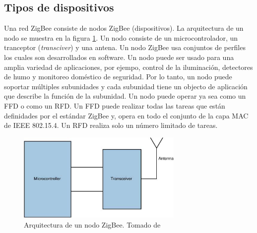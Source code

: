 \documentclass[10pt,journal,compsoc]{IEEEtran}
\begin{document}
\subsection{Tipos de dispositivos}
Una red ZigBee consiste de nodos ZigBee (dispositivos). La arquitectura de un nodo se muestra en la figura \ref{fig:device-architecture}. Un nodo consiste de un microcontrolador, un tranceptor (\emph{transciver}) y una antena. Un nodo ZigBee usa conjuntos de perfiles los cuales son desarrollados en software. Un nodo puede ser usado para una amplia variedad de aplicaciones, por ejempo, control de la iluminación, detectores de humo y monitoreo doméstico de seguridad. Por lo tanto, un nodo puede soportar múltiples subunidades y cada subunidad tiene un objecto de aplicación que describe la función de la subunidad. Un nodo puede operar ya sea como un FFD o como un RFD. Un FFD puede realizar todas las tareas que están definidades por el estándar ZigBee y, opera en todo el conjunto de la capa MAC de IEEE 802.15.4. Un RFD realiza solo un número limitado de tareas.

\begin{figure}[h]
    \centering
    \includegraphics[width=8cm]{device-architecture}
    \caption{Arquitectura de un nodo ZigBee. Tomado de \cite{gshewender}}
    \label{fig:device-architecture}
\end{figure}
\end{document}
